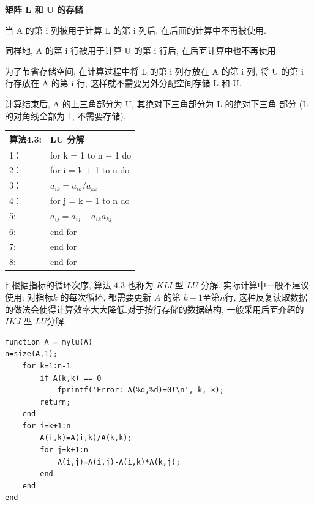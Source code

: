 \documentclass[12pt,a4paper]{article}
\begin{document}
{\bfseries 矩阵 L 和 U 的存储}

当 A 的第 i 列被用于计算 L 的第 i 列后, 在后面的计算中不再被使用.

同样地, A 的第 i 行被用于计算 U 的第 i 行后, 在后面计算中也不再使用

\begin{framed}
	为了节省存储空间, 在计算过程中将 L 的第 i 列存放在 A 的第 i 列, 将
	U 的第 i 行存放在 A 的第 i 行, 这样就不需要另外分配空间存储 L 和 U.
\end{framed}

计算结束后, A 的上三角部分为 U, 其绝对下三角部分为 L 的绝对下三角
部分 (L 的对角线全部为 1, 不需要存储).
\newpage
\begin{table}  
	\begin{tabular*}{16cm}{ll}  
		\hline  
		算法4.3: & LU 分解 \\  
		\hline  
		1：   &for k = 1 to n − 1 do\\  
		2：   &\qquad for i = k + 1 to n do\\
		3：   &\qquad \qquad $a_{ik} = a_{ik}/a_{kk}$\\
		4：   &\qquad \qquad for j = k + 1 to n do\\
		5:    &\qquad \qquad \qquad $a_{ij} = a_{ij} − a_{ik}a_{kj}$\\
		6:    &\qquad \qquad end for\\
		7:    &\qquad end for\\
		8:    &end for \\
		\hline  
	\end{tabular*}  
\end{table} 

\begin{framed}
	
	† 根据指标的循环次序, 算法 $4.3$ 也称为 $KIJ$ 型 $LU$ 分解. 实际计算中一般不建议使用: 对指标$k$ 的每次循环, 都需要更新 $A$ 的第 $k + 1 $至第$n $行, 这种反复读取数据的做法会使得计算效率大大降低.对于按行存储的数据结构, 一般采用后面介绍的 $IKJ$ 型 $LU$分解.
	
\end{framed}


\begin{lstlisting}[language={[ANSI]C}] 
% Matlab code 1 : LU 分解
function A = mylu(A)
n=size(A,1);
	for k=1:n-1
		if A(k,k) == 0
			fprintf('Error: A(%d,%d)=0!\n', k, k);
		return;
	end
	for i=k+1:n
		A(i,k)=A(i,k)/A(k,k);
		for j=k+1:n
			A(i,j)=A(i,j)-A(i,k)*A(k,j);
		end
	end
end
\end{lstlisting}
\end{document}
